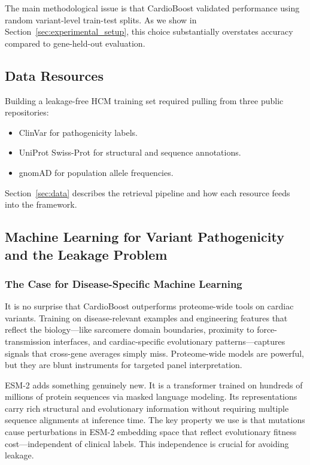 \documentclass[conference]{IEEEtran}
\begin{document}
The main methodological issue is that CardioBoost validated performance using random variant-level train-test splits. As we show in Section~\ref{sec:experimental_setup}, this choice substantially overstates accuracy compared to gene-held-out evaluation.

\subsection{Data Resources}

Building a leakage-free HCM training set required pulling from three public repositories:
\begin{itemize}
    \item ClinVar \cite{landrum2016clinvar} for pathogenicity labels.
    \item UniProt Swiss-Prot \cite{uniprot2023} for structural and sequence annotations.
    \item gnomAD \cite{karczewski2020} for population allele frequencies.
\end{itemize}
Section~\ref{sec:data} describes the retrieval pipeline and how each resource feeds into the framework.

\subsection{Machine Learning for Variant Pathogenicity and the Leakage Problem}

\subsubsection{The Case for Disease-Specific Machine Learning}
It is no surprise that CardioBoost outperforms proteome-wide tools on cardiac variants. Training on disease-relevant examples and engineering features that reflect the biology---like sarcomere domain boundaries, proximity to force-transmission interfaces, and cardiac-specific evolutionary patterns---captures signals that cross-gene averages simply miss. Proteome-wide models are powerful, but they are blunt instruments for targeted panel interpretation.

ESM-2 \cite{lin2023esm2} adds something genuinely new. It is a transformer trained on hundreds of millions of protein sequences via masked language modeling. Its representations carry rich structural and evolutionary information without requiring multiple sequence alignments at inference time. The key property we use is that mutations cause perturbations in ESM-2 embedding space that reflect evolutionary fitness cost---independent of clinical labels. This independence is crucial for avoiding leakage.
\end{document}
